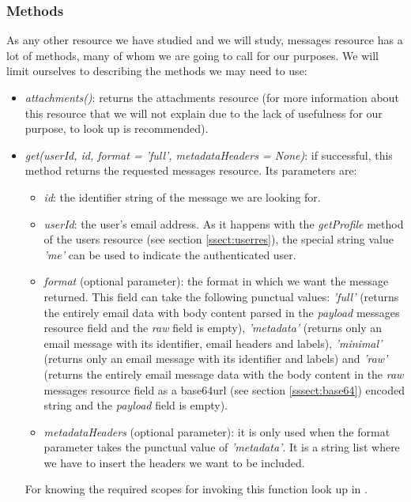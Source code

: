 \subsubsection{Methods}\label{sssect:msgmethods}
As any other resource we have studied and we will study, messages resource has a lot of methods, many of whom we are going to call for our purposes. We will limit ourselves to describing the methods we may need to use:

\begin{itemize}
	\item\textit{attachments()}: returns the attachments resource (for more information about this resource that we will not explain due to the lack of usefulness for our purpose, to look up \cite[/v1/reference/users/messages/attachments]{gmailAPI} is recommended).
	\item\textit{get(userId, id, format = 'full', metadataHeaders = None)}: if successful, this method returns the requested messages resource. Its parameters are:
	\begin{itemize}
		\item\textit{id}: the identifier string of the message we are looking for.
		\item\textit{userId}: the user's email address. As it happens with the \textit{getProfile} method of the users resource (see section \ref{ssect:userres}), the special string value \textit{'me'} can be used to indicate the authenticated user.
		\item\textit{format} (optional parameter): the format in which we want the message returned. This field can take the following punctual values: \textit{'full'} (returns the entirely email data with body content parsed in the \textit{payload} messages resource field and the \textit{raw} field is empty), \textit{'metadata'} (returns only an email message with its identifier, email headers and labels), \textit{'minimal'} (returns only an email message with its identifier and labels) and \textit{'raw'} (returns the entirely email message data with the body content in the \textit{raw} messages resource field as a base64url (see section \ref{sssect:base64}) encoded string and the \textit{payload} field is empty).
		\item\textit{metadataHeaders} (optional parameter): it is only used when the format parameter takes the punctual value of \textit{'metadata'}. It is a string list where we have to insert the headers we want to be included.
	\end{itemize}
	For knowing the required scopes for invoking this function look up in \cite[/v1/reference/users/messages/get]{gmailAPI}.

\end{itemize}
